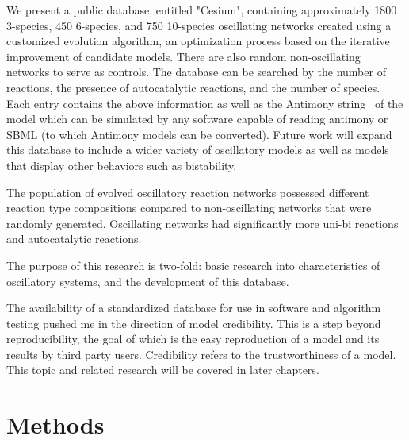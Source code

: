\documentclass[12pt]{report}
\begin{document}
We present a public database, entitled "Cesium",  containing approximately 1800 3-species, 450 6-species, and 750 10-species oscillating networks created using a customized evolution algorithm, an optimization process based on the iterative improvement of candidate models. There are also random non-oscillating networks to serve as controls. The database can be searched by the number of reactions, the presence of autocatalytic reactions, and the number of species. Each entry contains the above information as well as the Antimony string~\cite{Smith2009} of the model which can be simulated by any software capable of reading antimony or SBML (to which Antimony models can be converted). Future work will expand this database to include a wider variety of oscillatory models as well as models that display other behaviors such as bistability. 

The population of evolved oscillatory reaction networks possessed different reaction type compositions compared to non-oscillating networks that were randomly generated. Oscillating networks had significantly more uni-bi reactions and autocatalytic reactions. 


The purpose of this research is two-fold: basic research into characteristics of oscillatory systems, and the development of this database.

The availability of a standardized database for use in software and algorithm testing pushed me in the direction of model credibility. This is a step beyond reproducibility, the goal of which is the easy reproduction of a model and its results by third party users. Credibility refers to the trustworthiness of a model. This topic and related research will be covered in later chapters.

\section{Methods}
\end{document}
